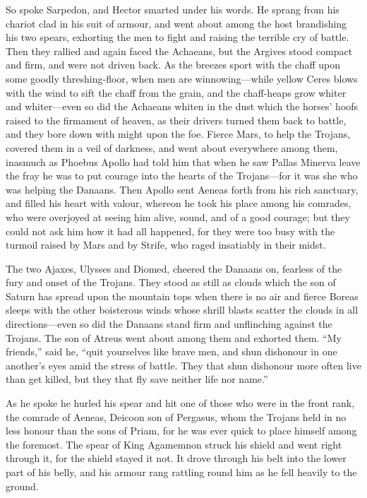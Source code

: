 So spoke Sarpedon, and Hector smarted under his words. He sprang from his
chariot clad in his suit of armour, and went about among the host
brandishing his two spears, exhorting the men to fight and raising the
terrible cry of battle. Then they rallied and again faced the Achaeans,
but the Argives stood compact and firm, and were not driven back. As the
breezes sport with the chaff upon some goodly threshing-floor, when men
are winnowing—while yellow Ceres blows with the wind to sift the
chaff from the grain, and the chaff-heaps grow whiter and whiter—even
so did the Achaeans whiten in the dust which the horses’ hoofs raised to
the firmament of heaven, as their drivers turned them back to battle, and
they bore down with might upon the foe. Fierce Mars, to help the Trojans,
covered them in a veil of darkness, and went about everywhere among them,
inasmuch as Phoebus Apollo had told him that when he saw Pallas Minerva
leave the fray he was to put courage into the hearts of the Trojans—for
it was she who was helping the Danaans. Then Apollo sent Aeneas forth from
his rich sanctuary, and filled his heart with valour, whereon he took his
place among his comrades, who were overjoyed at seeing him alive, sound,
and of a good courage; but they could not ask him how it had all happened,
for they were too busy with the turmoil raised by Mars and by Strife, who
raged insatiably in their midst.

The two Ajaxes, Ulysses and Diomed, cheered the Danaans on, fearless of
the fury and onset of the Trojans. They stood as still as clouds which the
son of Saturn has spread upon the mountain tops when there is no air and
fierce Boreas sleeps with the other boisterous winds whose shrill blasts
scatter the clouds in all directions—even so did the Danaans stand
firm and unflinching against the Trojans. The son of Atreus went about
among them and exhorted them. “My friends,” said he, “quit yourselves like
brave men, and shun dishonour in one another’s eyes amid the stress of
battle. They that shun dishonour more often live than get killed, but they
that fly save neither life nor name.”

As he spoke he hurled his spear and hit one of those who were in the front
rank, the comrade of Aeneas, Deicoon son of Pergasus, whom the Trojans
held in no less honour than the sons of Priam, for he was ever quick to
place himself among the foremost. The spear of King Agamemnon struck his
shield and went right through it, for the shield stayed it not. It drove
through his belt into the lower part of his belly, and his armour rang
rattling round him as he fell heavily to the ground.

